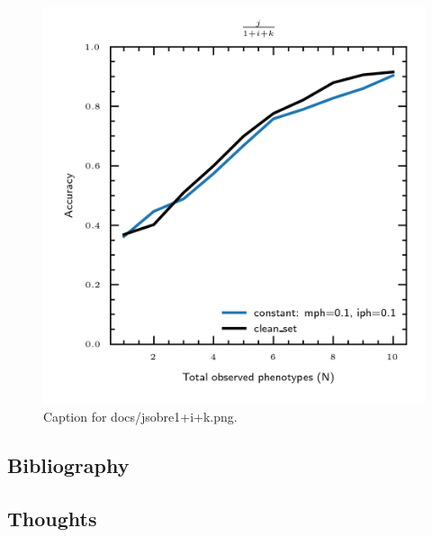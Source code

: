 \documentclass{article}
\begin{document}
\begin{figure}[h] \centering \includegraphics{docs/jsobre1+i+k.png} \caption{Caption for docs/jsobre1+i+k.png.} \end{figure}
\subsection{Bibliography}
\subsection{Thoughts}
\end{document}

